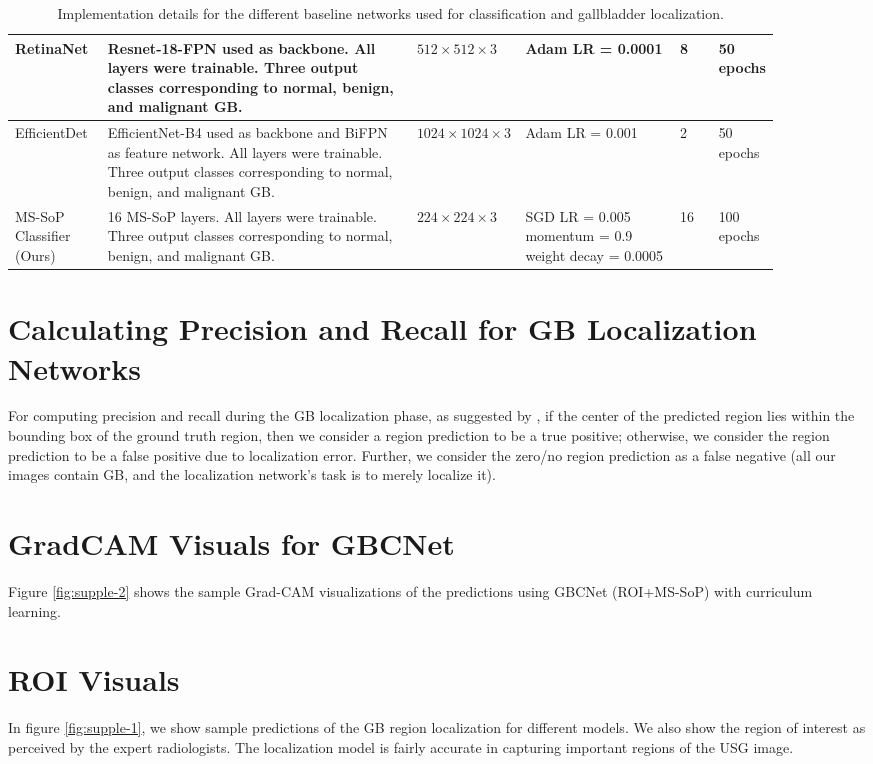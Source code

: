 \documentclass[10pt,twocolumn,letterpaper]{article}
\begin{document}
\begin{table*}[h]
{\begin{tabular}{p{0.12\linewidth}p{0.4\linewidth}p{0.06\linewidth}p{0.2\linewidth}p{0.05\linewidth}p{0.06\linewidth}}
RetinaNet \cite{retinanet} & Resnet-18-FPN used as backbone. All layers were trainable. Three output classes corresponding to normal, benign, and malignant GB. & $512\times512\times3$ & Adam LR = 0.0001 & 8 & 50 epochs \\ \hline
EfficientDet \cite{efficientdet} & EfficientNet-B4 used as backbone and BiFPN as feature network. All layers were trainable. Three output classes corresponding to normal, benign, and malignant GB. & $1024\times1024\times3$ & Adam LR = 0.001 & 2 & 50 epochs \\ \hline
MS-SoP Classifier (Ours) & 16 MS-SoP layers. All layers were trainable. Three output classes corresponding to normal, benign, and malignant GB. & $224\times224\times3$ & SGD LR = 0.005 momentum = 0.9 weight decay = 0.0005 & 16 & 100 epochs \\
\bottomrule
\end{tabular}
}
\caption{Implementation details for the different baseline networks used for classification and gallbladder localization.}
\label{tbl:configs}
\end{table*}

\section{Calculating Precision and Recall for GB Localization Networks}
\label{supp:eval_metric}
For computing precision and recall during the GB localization phase, as suggested by \cite{ribli2018detecting}, if the center of the predicted region lies within the bounding box of the ground truth region, then we consider a region prediction to be a true positive; otherwise, we consider the region prediction to be a false positive due to localization error. Further, we consider the zero/no region prediction as a false negative (all our images contain GB, and the localization network's task is to merely localize it). 

\section{GradCAM Visuals for GBCNet}
\label{supp:cam_vis}
Figure \ref{fig:supple-2} shows the sample Grad-CAM visualizations of the predictions using GBCNet (ROI+MS-SoP) with curriculum learning. %

\section{ROI Visuals}
\label{supp:roi_vis}
In figure \ref{fig:supple-1}, we show sample predictions of the GB region localization for different models. We also show the region of interest as perceived by the expert radiologists. The localization model is fairly accurate in capturing important regions of the USG image.
\end{document}
